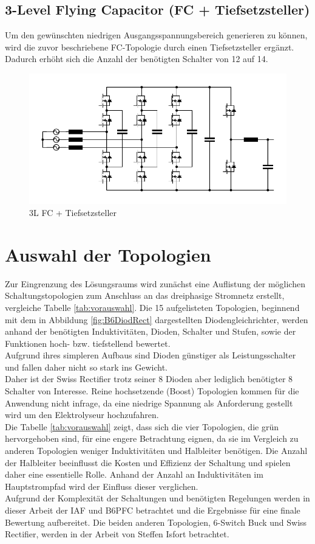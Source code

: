 	
	\subsection{3-Level Flying Capacitor (FC + Tiefsetzsteller)}
		Um den gewünschten niedrigen Ausgangsspannungsbereich generieren zu können, wird die zuvor beschriebene FC-Topologie durch einen Tiefsetzsteller ergänzt. Dadurch erhöht sich die Anzahl der benötigten Schalter von 12 auf 14.
		\begin{figure}
			\centering
			\includegraphics[width=1\linewidth]{content/Grafiken/3L-FC-Boost+Buck}
			\caption{3L FC + Tiefsetzsteller}
			\label{fig:3l-fc-boostbuck}
		\end{figure}

\section{Auswahl der Topologien}
Zur Eingrenzung des Lösungsraums wird zunächst eine Auflistung der möglichen Schaltungstopologien zum Anschluss an das dreiphasige Stromnetz erstellt, vergleiche Tabelle \ref{tab:vorauswahl}. Die 15 aufgelisteten Topologien, beginnend mit dem in Abbildung \ref{fig:B6DiodRect} dargestellten Diodengleichrichter, werden anhand der benötigten Induktivitäten, Dioden, Schalter und Stufen, sowie der Funktionen hoch- bzw. tiefstellend bewertet.\\
Aufgrund ihres simpleren Aufbaus sind Dioden günstiger als Leistungsschalter und fallen daher nicht so stark ins Gewicht. \\
Daher ist der Swiss Rectifier trotz seiner 8 Dioden aber lediglich benötigter 8 Schalter von Interesse. Reine hochsetzende (Boost) Topologien kommen für die Anwendung nicht infrage, da eine niedrige Spannung als Anforderung gestellt wird um den Elektrolyseur hochzufahren. \\
Die Tabelle \ref{tab:vorauswahl} zeigt, dass sich die vier Topologien, die grün hervorgehoben sind, für eine engere Betrachtung eignen, da sie im Vergleich zu anderen Topologien weniger Induktivitäten und Halbleiter benötigen. Die Anzahl der Halbleiter beeinflusst die Kosten und Effizienz der Schaltung und spielen daher eine essentielle Rolle. Anhand der Anzahl an Induktivitäten im Hauptstrompfad wird der Einfluss dieser verglichen. \\
Aufgrund der Komplexität der Schaltungen und benötigten Regelungen werden in dieser Arbeit der \gls{IAF} und \gls{B6PFC} betrachtet und die Ergebnisse für eine finale Bewertung aufbereitet. Die beiden anderen Topologien, 6-Switch Buck und Swiss Rectifier, werden in  der Arbeit von Steffen Isfort betrachtet.

